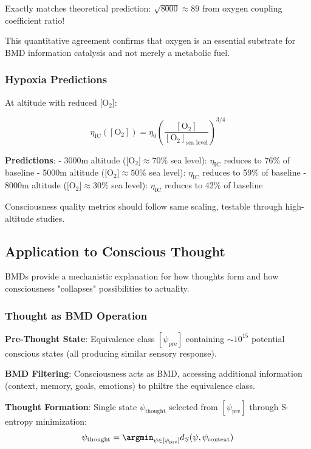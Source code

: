 \documentclass[11pt,onecolumn]{article}
\begin{document}
Exactly matches theoretical prediction: $\sqrt{8000} \approx 89$ from oxygen coupling coefficient ratio!

This quantitative agreement confirms that oxygen is an essential substrate for BMD information catalysis and not merely a metabolic fuel.

\subsubsection{Hypoxia Predictions}

At altitude with reduced [O$_2$]:

\begin{equation}
\eta_{\text{IC}}([\text{O}_2]) = \eta_0 \left(\frac{[\text{O}_2]}{[\text{O}_2]_{\text{sea level}}}\right)^{3/4}
\end{equation}

\textbf{Predictions}:
- 3000m altitude ($[$O$_2] \approx 70\%$ sea level): $\eta_{\text{IC}}$ reduces to 76\% of baseline
- 5000m altitude ($[$O$_2] \approx 50\%$ sea level): $\eta_{\text{IC}}$ reduces to 59\% of baseline
- 8000m altitude ($[$O$_2] \approx 30\%$ sea level): $\eta_{\text{IC}}$ reduces to 42\% of baseline

Consciousness quality metrics should follow same scaling, testable through high-altitude studies.

\subsection{Application to Conscious Thought}

BMDs provide a mechanistic explanation for how thoughts form and how consciousness "collapses" possibilities to actuality.

\subsubsection{Thought as BMD Operation}

\textbf{Pre-Thought State}: Equivalence class $[\psi_{\text{pre}}]$ containing $\sim 10^{15}$ potential conscious states (all producing similar sensory response).

\textbf{BMD Filtering}: Consciousness acts as BMD, accessing additional information (context, memory, goals, emotions) to philtre the equivalence class.

\textbf{Thought Formation}: Single state $\psi_{\text{thought}}$ selected from $[\psi_{\text{pre}}]$ through S-entropy minimization:
\begin{equation}
\psi_{\text{thought}} = \argmin_{\psi \in [\psi_{\text{pre}}]} d_S(\psi, \psi_{\text{context}})
\end{equation}
\end{document}
